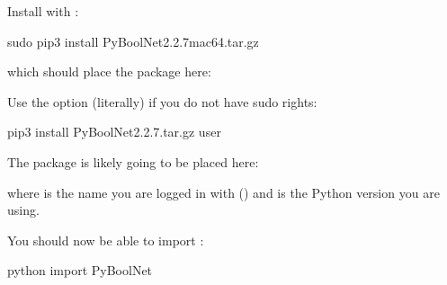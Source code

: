 \documentclass[letterpaper,10pt,english]{sphinxmanual}
\begin{document}
Install  with :

\begin{sphinxVerbatim}[commandchars=\\\{\}]
\PYGZdl{} sudo pip3 install PyBoolNet\PYGZhy{}2.2.7\PYGZus{}mac64.tar.gz
\end{sphinxVerbatim}

which should place the package here:

\begin{sphinxVerbatim}[commandchars=\\\{\}]
\end{sphinxVerbatim}

Use the option  (literally) if you do not have sudo rights:

\begin{sphinxVerbatim}[commandchars=\\\{\}]
\PYGZdl{} pip3 install PyBoolNet\PYGZhy{}2.2.7.tar.gz \PYGZhy{}\PYGZhy{}user
\end{sphinxVerbatim}

The package is likely going to be placed here:

\begin{sphinxVerbatim}[commandchars=\\\{\}]
\end{sphinxVerbatim}

where  is the name you are logged in with () and  is the Python version you are using.

You should now be able to import :

\begin{sphinxVerbatim}[commandchars=\\\{\}]
\PYGZdl{} python
\PYGZgt{}\PYGZgt{}\PYGZgt{} import PyBoolNet
\end{sphinxVerbatim}
\end{document}
